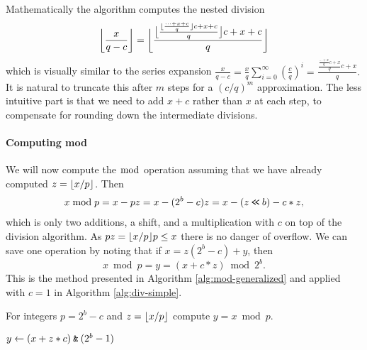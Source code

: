 Mathematically the algorithm computes the nested division
$$
	\bbfloor{\frac{x}{q-c}}
	=
	\bbfloor{\frac{
			\bfloor{\frac{
					\floor{\frac{
							\dots+x+c
						}{q}}c +x+c
				}{q}}c +x+c
		}{q}}
	\vspace{-1em} %
$$
which is visually similar to the series expansion
$
	\frac{x}{q-c}
	= \frac{x}{q}\sum_{i=0}^\infty (\frac{c}{q})^i
	= \frac{\frac{\frac{\dots+x}{q}c+x}{q}c+x}{q}.
$
It is natural to truncate this after $m$ steps for a $(c/q)^m$ approximation.
The less intuitive part is that we need to add $x+c$ rather than $x$ at each step, to compensate for rounding down the intermediate divisions.

\paragraph{Computing mod}
We will now compute the $\bmod$ operation assuming that
we have already computed $z=\lfloor {x/p} \rfloor$. Then
\begin{align}
	x \bmod p
	= x - pz
	= x - (2^b-c)z
	= x - (z\mathbin{\texttt{<\!<}} b) - c*z,
\end{align}
which is only two additions, a shift, and a multiplication with $c$ on top of the division algorithm.
As $pz = \lfloor {x/p} \rfloor p \le x$ there is no danger of overflow.
We can save one operation by noting
that if $x = z (2^b-c) + y$, then
$$x\bmod p = y=\left(x+c*z \right) \bmod 2^b.$$
This is the method presented in Algorithm \ref{alg:mod-generalized} and applied with $c=1$ in Algorithm \ref{alg:div-simple}.
\begin{algorithm}[H]
	\caption{For integers $p=2^b-c$ and $z=\lfloor {x/p} \rfloor$ compute
		$y=x \bmod p$.}
	\label{alg:mod-generalized}
	\begin{algorithmic}
		\State $y \gets (x + z*c) \mathbin{\texttt{\&}} (2^b-1)$
	\end{algorithmic}
\end{algorithm}




